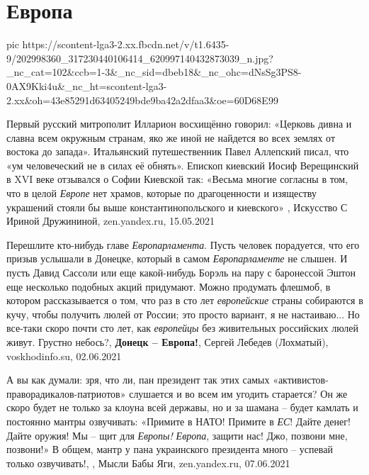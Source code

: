  
 
 
 
 
\chapter{Европа}
\label{sec:slova.evropa}

\ifcmt
  pic https://scontent-lga3-2.xx.fbcdn.net/v/t1.6435-9/202998360_317230440106414_620997140432873039_n.jpg?_nc_cat=102&ccb=1-3&_nc_sid=dbeb18&_nc_ohc=dNsSg3PS8-0AX9Kki4u&_nc_ht=scontent-lga3-2.xx&oh=43e85291d63405249bde9ba42a2dfaa3&oe=60D68E99
\fi

Первый русский митрополит Илларион восхищённо говорил: «Церковь дивна и славна
всем окружным странам, яко же иной не найдется во всех землях от востока до
запада».  Итальянский путешественник Павел Аллепский писал, что «ум
человеческий не в силах её обнять».  Епископ киевский Иосиф Верещинский в XVI
веке отзывался о Софии Киевской так: «Весьма многие согласны в том, что в целой
\emph{Европе} нет храмов, которые по драгоценности и изяществу украшений стояли бы
выше константинопольского и киевского»
, 
Искусство С Ириной Дружининой, zen.yandex.ru, 15.05.2021

Перешлите кто-нибудь главе \emph{Европарламента}. Пусть человек порадуется, что
его призыв услышали в Донецке, который в самом \emph{Европарламенте} не слышен.
И пусть Давид Сассоли или еще какой-нибудь Борэль на пару с баронессой Эштон
еще несколько подобных акций придумают.  Можно продумать флешмоб, в котором
рассказывается о том, что раз в сто лет \emph{европейские} страны собираются в
кучу, чтобы получить люлей от России; это просто вариант, я не настаиваю... Но
все-таки скоро почти сто лет, как \emph{европейцы} без живительных российских
люлей живут.  Грустно небось?, 
\textbf{Донецк – Европа!}, Сергей Лебедев (Лохматый), voskhodinfo.su, 02.06.2021

А вы как думали: зря, что ли, пан президент так этих самых
«активистов-праворадикалов-патриотов» слушается и во всем им угодить старается?
Он же скоро будет не только за клоуна всей державы, но и за шамана – будет
камлать и постоянно мантры озвучивать: «Примите в НАТО! Примите в \emph{ЕС}!
Дайте денег! Дайте оружия! Мы – щит для \emph{Европы!} \emph{Европа}, защити
нас! Джо, позвони мне, позвони!» В общем, мантр у пана украинского президента
много – успевай только озвучивать!,
, Мысли Бабы Яги, zen.yandex.ru, 07.06.2021


